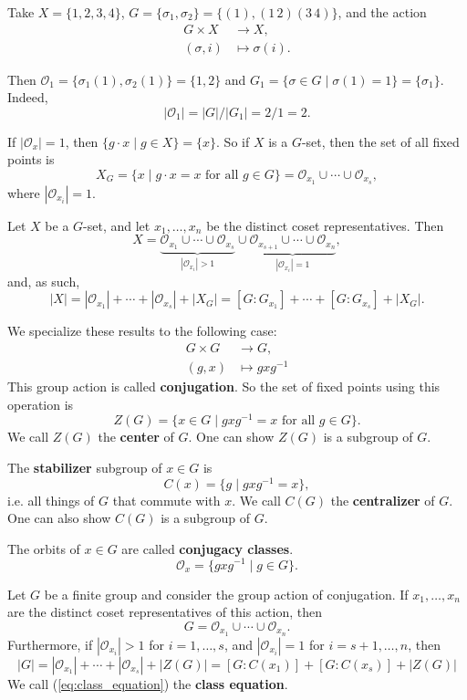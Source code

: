 \begin{example}
	Take $X=\{1,2,3,4\}$, $G=\{\sigma_1,\sigma_2\}=\{(1),(1\,2)(3\,4)\}$, and the action
	\begin{align*}
		G\times X&\to X,\\
		(\sigma,i)&\mapsto \sigma(i).
	\end{align*}

	Then $\mathcal O_1=\{\sigma_1(1),\sigma_2(1)\}=\{1,2\}$ and $G_1=\{\sigma\in G\mid\sigma(1)=1\}=\{\sigma_1\}$. Indeed,
	$$|\mathcal O_1|=|G|/|G_1|=2/1=2.$$
\end{example}

\begin{remark}
	If $|\mathcal O_x|=1$, then $\{g\cdot x\mid g\in X\}=\{x\}$. So if $X$ is a $G$-set, then the set of all fixed points is 
	$$X_G=\{x\mid g\cdot x=x\text{ for all }g\in G\}=\mathcal O_{x_1}\cup\cdots\cup\mathcal O_{x_s},$$
	where $|\mathcal O_{x_i}|=1$.
\end{remark}

Let $X$ be a $G$-set, and let $x_1,\hdots,x_n$ be the distinct coset representatives. Then
$$X=\underbrace{\mathcal O_{x_1}\cup\cdots\cup\mathcal O_{x_s}}_{|\mathcal O_{x_i}|>1}\cup \underbrace{\mathcal O_{x_{s+1}}\cup\cdots\cup\mathcal O_{x_n}}_{|\mathcal O_{x_i}|=1},$$
and, as such,
$$|X|=|\mathcal O_{x_1}|+\cdots+|\mathcal O_{x_s}|+|X_G|=[G:G_{x_1}]+\cdots+[G:G_{x_s}]+|X_G|.$$

We specialize these results to the following case:
\begin{align*}
	G\times G&\to G,\\
	(g,x)&\mapsto gxg^{-1}
\end{align*}
This group action is called \textbf{conjugation}. So the set of fixed points using this operation is
$$Z(G)=\{x\in G\mid gxg^{-1}=x\text{ for all }g\in G\}.$$
We call $Z(G)$ the \textbf{center} of $G$. One can show $Z(G)$ is a subgroup of $G$.

The \textbf{stabilizer} subgroup of $x\in G$ is
$$C(x)=\{g\mid gxg^{-1}=x\},$$
i.e. all things of $G$ that commute with $x$. We call $C(G)$ the \textbf{centralizer} of $G$. One can also show $C(G)$ is a subgroup of $G$.

The orbits of $x\in G$ are called \textbf{conjugacy classes}.
$$\mathcal O_x=\{gxg^{-1}\mid g\in G\}.$$

\begin{theorem}
	Let $G$ be a finite group and consider the group action of conjugation. If $x_1,\hdots, x_n$ are the distinct coset representatives of this action, then
	$$G=\mathcal O_{x_1}\cup\cdots\cup\mathcal O_{x_n}.$$
	Furthermore, if $|\mathcal O_{x_i}|>1$ for $i=1,\hdots, s$, and $|\mathcal O_{x_i}|=1$ for $i=s+1,\hdots,n$, then
	\begin{equation}\label{eq:class_equation}
		|G|=|\mathcal O_{x_1}|+\cdots+|\mathcal O_{x_s}|+|Z(G)|=[G:C(x_1)]+[G:C(x_s)]+|Z(G)|
	\end{equation}
	We call (\ref{eq:class_equation}) the \textbf{class equation}.
\end{theorem}